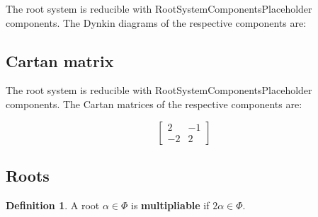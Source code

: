 \documentclass[11pt]{article}
\newcommand{\tbf}{\textbf}
\theoremstyle{definition}
\newtheorem{definition}{Definition}[section]
\newif\ifrootsystemirreducible
\begin{document}
\ifrootsystemirreducible
The root system is irreducible and has Dynkin diagram:
\else
The root system is reducible with RootSystemComponentsPlaceholder components. The Dynkin diagrams of the respective components are:
\fi

\begin{center}
\end{center}

\subsection{Cartan matrix}

\ifrootsystemirreducible
The root system is irreducible and has Cartan matrix:
\else
The root system is reducible with RootSystemComponentsPlaceholder components. The Cartan matrices of the respective components are:
\fi

\[
\left[\begin{matrix}2 & -1\\-2 & 2\end{matrix}\right]
\]

\subsection{Roots}

\begin{definition}
A root $\alpha \in \Phi$ is \tbf{multipliable} if $2\alpha \in \Phi$.
\end{definition}
\end{document}

